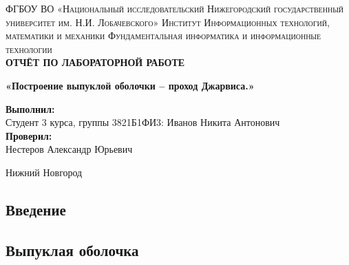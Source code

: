 \documentclass[a4paper, 12pt]{article}
\begin{document}
\graphicspath{ {images} }
\graphicspath{ {Test} }
\begin{titlepage}
\begin{center}
\textsc{\normalsize ФГБОУ ВО «Национальный исследовательский Нижегородский
государственный университет им. Н.И. Лобачевского»
\vspace{5pt}
\break Институт Информационных технологий, математики и механики
\vspace{5pt}
\break Фундаментальная информатика и информационные технологии}\\



\vspace{150pt}
\textbf{\Large ОТЧЁТ ПО ЛАБОРАТОРНОЙ РАБОТЕ}\\
\vspace{15pt}

\textbf{\large «Построение выпуклой оболочки – проход Джарвиса.»}\\
\vspace{10pt}
\end{center}

\vspace{250pt}

\hfill
\begin{minipage}{.5\textwidth}
\textbf{Выполнил:\\[0.5mm]}
Студент 3 курса, группы 3821Б1ФИ3:
\break Иванов Никита Антонович\\[5mm]

\textbf{Проверил:\\[2mm]}
Нестеров Александр Юрьевич\\
\end{minipage}%
\vfill
\begin{center}
 Нижний Новгород
\end{center}
\end{titlepage}

\renewcommand*\contentsname{Содержание}
\newpage
\tableofcontents


\newpage

\begin{center}
    \section{Введение}
    \subsection{Выпуклая оболочка}
\end{center}
\end{document}
